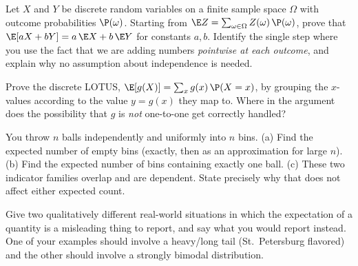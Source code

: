 \begin{exercise}
\label{ch08:exr-proof-linearity}
Let $X$ and $Y$ be discrete random variables on a finite sample space $\Omega$
with outcome probabilities $\P(\omega)$. Starting from $\E Z = \sum_{\omega \in
\Omega} Z(\omega)\,\P(\omega)$, prove that $\E[aX + bY] = a\,\E X + b\,\E Y$ for
constants $a, b$. Identify the single step where you use the fact that we are
adding numbers \emph{pointwise at each outcome}, and explain why no assumption
about independence is needed.
\end{exercise}

\begin{exercise}
\label{ch08:exr-proof-lotus}
Prove the discrete LOTUS, $\E[g(X)] = \sum_x g(x)\,\P(X=x)$, by grouping the
$x$-values according to the value $y = g(x)$ they map to. Where in the argument
does the possibility that $g$ is \emph{not} one-to-one get correctly handled?
\end{exercise}

\begin{exercise}
\label{ch08:exr-balls}
You throw $n$ balls independently and uniformly into $n$ bins.
(a) Find the expected number of empty bins (exactly, then as an approximation for
large $n$).
(b) Find the expected number of bins containing exactly one ball.
(c) These two indicator families overlap and are dependent. State precisely why
that does not affect either expected count.
\end{exercise}

\begin{exercise}
\label{ch08:exr-conceptual}
Give two qualitatively different real-world situations in which the expectation of
a quantity is a misleading thing to report, and say what you would report instead.
One of your examples should involve a heavy/long tail (St.\ Petersburg flavored)
and the other should involve a strongly bimodal distribution.
\end{exercise}
